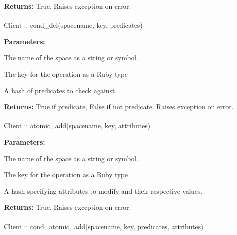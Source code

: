 \noindent\textbf{Returns:}
True.  Raises exception on error.

\paragraph{}
\begin{ccode}
Client :: cond_del(spacename, key, predicates)
\end{ccode}
\funcdesc 

\noindent\textbf{Parameters:}
\begin{description}[labelindent=\widthof{{\code{predicates}}},leftmargin=*,noitemsep,nolistsep,align=right]
\item[\code{spacename}] The name of the space as a string or symbol.
\item[\code{key}] The key for the operation as a Ruby type
\item[\code{predicates}] A hash of predicates to check against.
\end{description}

\noindent\textbf{Returns:}
True if predicate, False if not predicate.  Raises exception on error.

\paragraph{}
\begin{ccode}
Client :: atomic_add(spacename, key, attributes)
\end{ccode}
\funcdesc 

\noindent\textbf{Parameters:}
\begin{description}[labelindent=\widthof{{\code{attributes}}},leftmargin=*,noitemsep,nolistsep,align=right]
\item[\code{spacename}] The name of the space as a string or symbol.
\item[\code{key}] The key for the operation as a Ruby type
\item[\code{attributes}] A hash specifying attributes to modify and their respective values.
\end{description}

\noindent\textbf{Returns:}
True.  Raises exception on error.

\paragraph{}
\begin{ccode}
Client :: cond_atomic_add(spacename, key, predicates, attributes)
\end{ccode}
\funcdesc 

